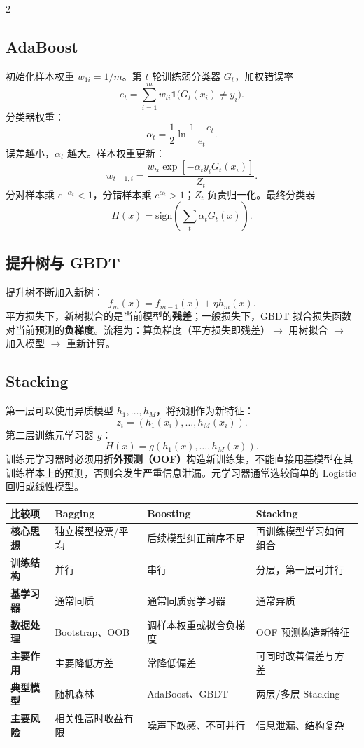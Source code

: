 \documentclass[9pt,a4paper,UTF8]{ctexart}
\begin{document}
\begin{multicols}{2}
\subsection{AdaBoost}
初始化样本权重 $w_{1i}=1/m$。第 $t$ 轮训练弱分类器 $G_t$，加权错误率
\[
e_t=\sum_{i=1}^{m}w_{ti}\mathbf 1\bigl(G_t(x_i)\ne y_i\bigr).
\]
分类器权重：
\[
\alpha_t=\frac12\ln\frac{1-e_t}{e_t}.
\]
误差越小，$\alpha_t$ 越大。样本权重更新：
\[
w_{t+1,i}=\frac{w_{ti}\exp[-\alpha_t y_iG_t(x_i)]}{Z_t}.
\]
分对样本乘 $e^{-\alpha_t}<1$，分错样本乘 $e^{\alpha_t}>1$；$Z_t$ 负责归一化。最终分类器
\[
H(x)=\mathrm{sign}\left(\sum_t\alpha_tG_t(x)\right).
\]

\subsection{提升树与 GBDT}
提升树不断加入新树：
\[
f_m(x)=f_{m-1}(x)+\eta h_m(x).
\]
平方损失下，新树拟合的是当前模型的\textbf{残差}；一般损失下，GBDT 拟合损失函数对当前预测的\textbf{负梯度}。流程为：算负梯度（平方损失即残差）$\to$ 用树拟合 $\to$ 加入模型 $\to$ 重新计算。

\subsection{Stacking}
第一层可以使用异质模型 $h_1,\ldots,h_M$，将预测作为新特征：
\[
z_i=(h_1(x_i),\ldots,h_M(x_i)).
\]
第二层训练元学习器 $g$：
\[
H(x)=g(h_1(x),\ldots,h_M(x)).
\]
训练元学习器时必须用\textbf{折外预测（OOF）}构造新训练集，不能直接用基模型在其训练样本上的预测，否则会发生严重信息泄漏。元学习器通常选较简单的 Logistic 回归或线性模型。
\end{multicols}

\begin{center}
\begin{tabularx}{\textwidth}{>{\bfseries}p{}XXX}
\toprule
比较项 & Bagging & Boosting & Stacking\\\midrule
核心思想 & 独立模型投票/平均 & 后续模型纠正前序不足 & 再训练模型学习如何组合\\
训练结构 & 并行 & 串行 & 分层，第一层可并行\\
基学习器 & 通常同质 & 通常同质弱学习器 & 通常异质\\
数据处理 & Bootstrap、OOB & 调样本权重或拟合负梯度 & OOF 预测构造新特征\\
主要作用 & 主要降低方差 & 常降低偏差 & 可同时改善偏差与方差\\
典型模型 & 随机森林 & AdaBoost、GBDT & 两层/多层 Stacking\\
主要风险 & 相关性高时收益有限 & 噪声下敏感、不可并行 & 信息泄漏、结构复杂\\
\bottomrule
\end{tabularx}
\end{center}
\end{document}
